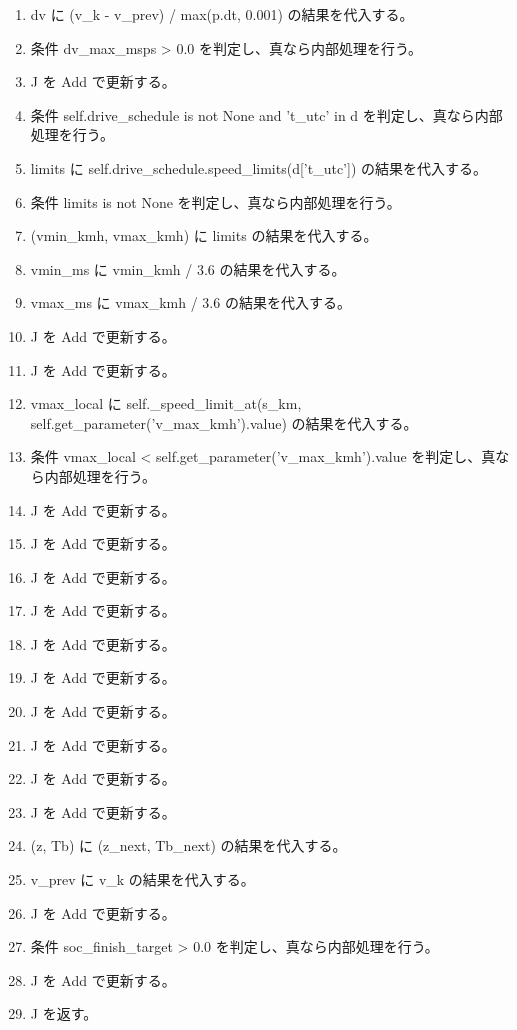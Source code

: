 \documentclass[a4paper,11pt]{article}
\begin{document}
\begin{enumerate}[leftmargin=1.8em]
\item   dv に (v\_k - v\_prev) / max(p.dt, 0.001) の結果を代入する。
\item   条件 dv\_max\_msps > 0.0 を判定し、真なら内部処理を行う。
\item     J を Add で更新する。
\item   条件 self.drive\_schedule is not None and 't\_utc' in d を判定し、真なら内部処理を行う。
\item     limits に self.drive\_schedule.speed\_limits(d['t\_utc']) の結果を代入する。
\item     条件 limits is not None を判定し、真なら内部処理を行う。
\item       (vmin\_kmh, vmax\_kmh) に limits の結果を代入する。
\item       vmin\_ms に vmin\_kmh / 3.6 の結果を代入する。
\item       vmax\_ms に vmax\_kmh / 3.6 の結果を代入する。
\item       J を Add で更新する。
\item       J を Add で更新する。
\item   vmax\_local に self.\_speed\_limit\_at(s\_km, self.get\_parameter('v\_max\_kmh').value) の結果を代入する。
\item   条件 vmax\_local < self.get\_parameter('v\_max\_kmh').value を判定し、真なら内部処理を行う。
\item     J を Add で更新する。
\item   J を Add で更新する。
\item   J を Add で更新する。
\item   J を Add で更新する。
\item   J を Add で更新する。
\item   J を Add で更新する。
\item   J を Add で更新する。
\item   J を Add で更新する。
\item   J を Add で更新する。
\item   J を Add で更新する。
\item   (z, Tb) に (z\_next, Tb\_next) の結果を代入する。
\item   v\_prev に v\_k の結果を代入する。
\item J を Add で更新する。
\item 条件 soc\_finish\_target > 0.0 を判定し、真なら内部処理を行う。
\item   J を Add で更新する。
\item J を返す。
            \end{enumerate}
\end{document}
